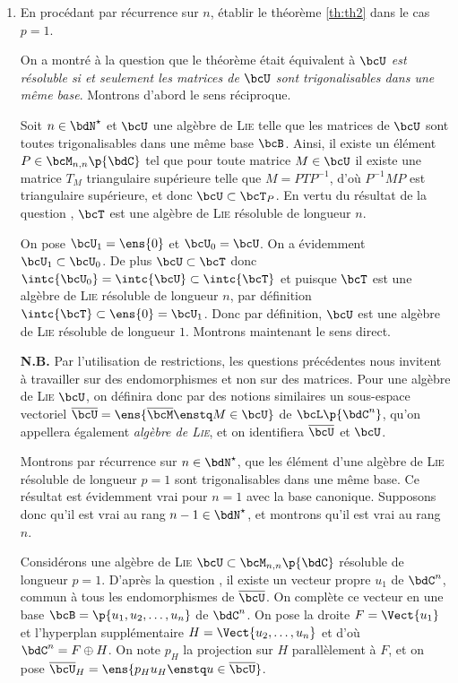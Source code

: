 \documentclass[a4paper,french,bookmarks]{article}
\begin{document}
\begin{enumerate}
        \item\label{qu:17} En procédant par récurrence sur $n$, établir le théorème {\sffamily\ref{th:th2}} dans le cas $p=1$.
        
        \begin{nproof}
            On a montré à la question  que le théorème était équivalent à \emph{$\bcU$ est résoluble si et seulement les matrices de $\bcU$ sont trigonalisables dans une même base}. Montrons d'abord le sens réciproque.\medskip
            
            Soit $n \in \bdN^\star$ et $\bcU$ une algèbre de \textsc{Lie} telle que les matrices de $\bcU$ sont toutes trigonalisables dans une même base $\bcB$. Ainsi, il existe un élément $P \in \bcM_{n, n}\p{\bdC}$ tel que pour toute matrice $M \in \bcU$ il existe une matrice $T_M$ triangulaire supérieure telle que $M = PTP^{-1}$, d'où $P^{-1}MP$ est triangulaire supérieure, et donc $\bcU \subset \bcT_P$. En vertu du résultat de la question , $\bcT$ est une algèbre de \textsc{Lie} résoluble de longueur $n$.
            
            On pose $\bcU_1 = \ens{0}$ et $\bcU_0 = \bcU$. On a évidemment $\bcU_1 \subset \bcU_0$. De plus $\bcU \subset \bcT$ donc $\intc{\bcU_0} = \intc{\bcU} \subset \intc{\bcT}$ et puisque $\bcT$ est une algèbre de \textsc{Lie} résoluble de longueur $n$, par définition $\intc{\bcT} \subset \ens{0} = \bcU_1$. Donc par définition, $\bcU$ est une algèbre de \textsc{Lie} résoluble de longueur $1$. Montrons maintenant le sens direct.\medskip
            
            {\color{main21}\textbf{\sffamily N.B.} Par l'utilisation de restrictions, les questions précédentes nous invitent à travailler sur des endomorphismes et non sur des matrices. Pour une algèbre de \textsc{Lie} $\bcU$, on définira donc par des notions similaires un sous-espace vectoriel $\overline{\bcU} = \ens{\overline \bcM \enstq M \in \bcU}$ de $\bcL\p{\bdC^n}$, qu'on appellera également \emph{algèbre de \textsc{Lie}}, et on identifiera $\overline\bcU$ et $\bcU$.}\medskip
            
            Montrons par récurrence sur $n \in \bdN^\star$, que les élément d'une algèbre de \textsc{Lie} résoluble de longueur $p = 1$ sont trigonalisables dans une même base. Ce résultat est évidemment vrai pour $n = 1$ avec la base canonique. Supposons donc qu'il est vrai au rang $n-1 \in \bdN^\star$, et montrons qu'il est vrai au rang $n$.
            
            Considérons une algèbre de \textsc{Lie} $\bcU \subset \bcM_{n, n}\p{\bdC}$ résoluble de longueur $p = 1$. D'après la question , il existe un vecteur propre $u_1$ de $\bdC^n$, commun à tous les endomorphismes de $\overline \bcU$. On complète ce vecteur en une base $\bcB = \p{u_1, u_2, \dots, u_n}$ de $\bdC^n$. On pose la droite $F = \Vect{u_1}$ et l'hyperplan supplémentaire $H = \Vect{u_2, \dots, u_n}$ et d'où $\bdC^n = F \oplus H$. On note $p_H$ la projection sur $H$ parallèlement à $F$, et on pose $\overline{\bcU}_H = \ens{p_H u_H \enstq u \in \overline \bcU}$.
            

\end{nproof}
\end{enumerate}
\end{document}

